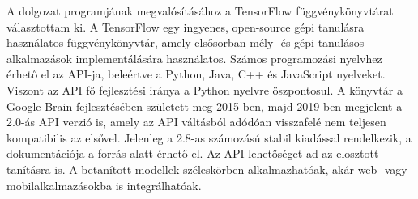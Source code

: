 




A dolgozat programjának megvalósításához a TensorFlow függvénykönyvtárat választottam ki. A TensorFlow egy ingyenes, open-source gépi tanulásra használatos függvénykönyvtár, amely elsősorban mély- és gépi-tanulásos alkalmazások implementálására használatos. Számos programozási nyelvhez érhető el az API-ja, beleértve a Python, Java, C++ és JavaScript nyelveket. Viszont az API fő fejlesztési iránya a Python nyelvre öszpontosul. A könyvtár a Google Brain fejlesztésében született meg 2015-ben, majd 2019-ben megjelent a 2.0-ás API verzió is, amely az API váltásból adódóan visszafelé nem teljesen kompatibilis az elsővel. Jelenleg a 2.8-as számozású stabil kiadással rendelkezik, a dokumentációja a \cite{tensorflow} forrás alatt érhető el. Az API lehetőséget ad az elosztott tanításra is. A betanított modellek széleskörben alkalmazhatóak, akár web- vagy mobilalkalmazásokba is integrálhatóak. 

